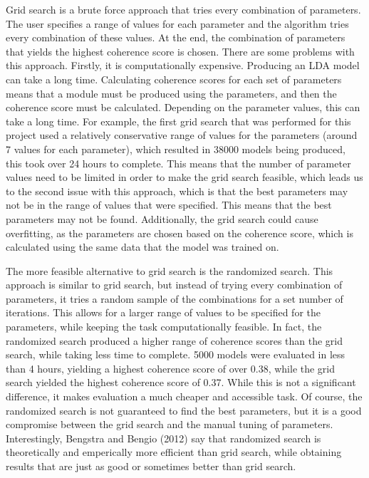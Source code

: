 Grid search is a brute force approach that tries every combination of parameters. The user specifies a range of values for each parameter and the algorithm tries every combination of these values. At the end, the combination of parameters that yields the highest coherence score is chosen. There are some problems with this approach. Firstly, it is computationally expensive. Producing an LDA model can take a long time. Calculating coherence scores for each set of parameters means that a module must be produced using the parameters, and then the coherence score must be calculated. Depending on the parameter values, this can take a long time. For example, the first grid search that was performed for this project used a relatively conservative range of values for the parameters (around 7 values for each parameter), which resulted in 38000 models being produced, this took over 24 hours to complete. This means that the number of parameter values need to be limited in order to make the grid search feasible, which leads us to the second issue with this approach, which is that the best parameters may not be in the range of values that were specified. This means that the best parameters may not be found. Additionally, the grid search could cause overfitting, as the parameters are chosen based on the coherence score, which is calculated using the same data that the model was trained on.

The more feasible alternative to grid search is the randomized search. This approach is similar to grid search, but instead of trying every combination of parameters, it tries a random sample of the combinations for a set number of iterations. This allows for a larger range of values to be specified for the parameters, while keeping the task computationally feasible. In fact, the randomized search produced a higher range of coherence scores than the grid search, while taking less time to complete. 5000 models were evaluated in less than 4 hours, yielding a highest coherence score of over 0.38, while the grid search yielded the highest coherence score of 0.37. While this is not a significant difference, it makes evaluation a much cheaper and accessible task. Of course, the randomized search is not guaranteed to find the best parameters, but it is a good compromise between the grid search and the manual tuning of parameters. Interestingly, Bengstra and Bengio (2012) say that randomized search is theoretically and emperically more efficient than grid search, while obtaining results that are just as good or sometimes better than grid search.~\cite{bergstra2012random}